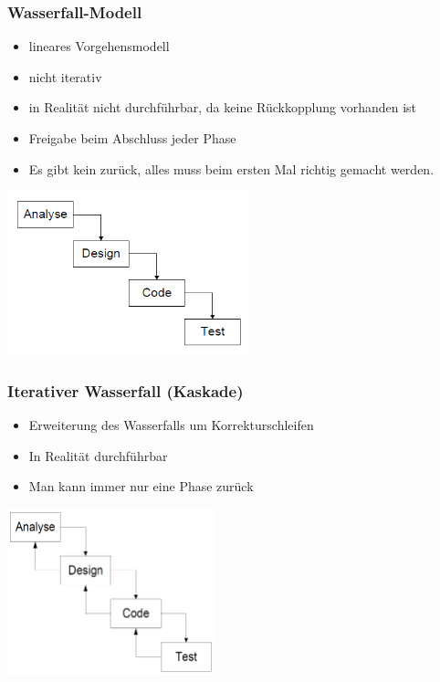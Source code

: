 \subsubsection{Wasserfall-Modell}
\begin{minipage}{10cm}
	\begin{itemize}
		\item lineares Vorgehensmodell
		\item nicht iterativ
		\item in Realität nicht durchführbar, da keine Rückkopplung vorhanden ist
		\item Freigabe beim Abschluss jeder Phase
		\item Es gibt kein zurück, alles muss beim ersten Mal richtig gemacht werden. 
	\end{itemize}
\end{minipage}
\begin{minipage}{5cm}
	\includegraphics[width=7cm]{images/wasserfallmodell}
\end{minipage}
	
\subsubsection{Iterativer Wasserfall (Kaskade)}
	\begin{minipage}{10cm}
		\begin{itemize}
			\item Erweiterung des Wasserfalls um Korrekturschleifen
			\item In Realität durchführbar
			\item Man kann immer nur eine Phase zurück
		\end{itemize}
	\end{minipage}
	\begin{minipage}{5cm}
	\includegraphics[width=6cm]{images/kaskade.png}	
	\end{minipage}

